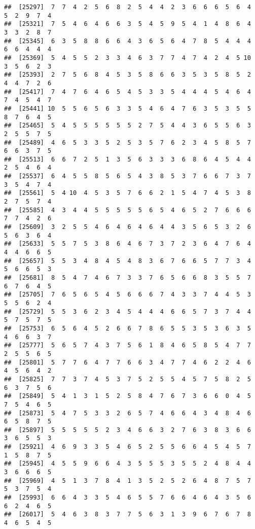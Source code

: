 \documentclass[
]{book}
\begin{document}
\begin{verbatim}
##  [25297]  7  7  4  2  5  6  8  2  5  4  4  2  3  6  6  6  5  6  4  5  2  9  7  4
##  [25321]  7  5  4  6  4  6  6  3  5  4  5  9  5  4  1  4  8  6  4  3  3  2  8  7
##  [25345]  6  3  5  8  8  6  6  4  3  6  5  6  4  7  8  5  4  4  4  6  6  4  4  4
##  [25369]  5  4  5  5  2  3  3  4  6  3  7  7  4  7  4  2  4  5 10  3  5  6  2  3
##  [25393]  2  7  5  6  8  4  5  3  5  8  6  6  3  5  3  5  8  5  2  4  4  7  2  6
##  [25417]  7  4  7  6  4  6  5  4  5  3  3  5  4  4  4  5  4  6  4  7  4  5  4  7
##  [25441] 10  5  5  6  5  6  3  3  5  4  6  4  7  6  3  5  3  5  5  8  7  6  4  5
##  [25465]  5  4  5  5  5  5  5  5  2  7  5  4  4  3  6  5  5  6  3  2  5  5  7  5
##  [25489]  4  6  5  3  3  5  2  5  3  5  7  6  2  3  4  5  8  5  7  6  6  3  7  5
##  [25513]  6  6  7  2  5  1  3  5  6  3  3  3  6  8  6  4  5  4  4  2  5  4  6  4
##  [25537]  6  4  5  5  8  5  6  5  4  3  8  5  3  7  6  6  7  3  7  3  5  4  7  4
##  [25561]  5  4 10  4  5  3  5  7  6  6  2  1  5  4  7  4  5  3  8  2  7  5  7  4
##  [25585]  4  3  4  4  5  5  5  5  5  6  5  4  6  5  2  7  6  6  6  7  7  4  2  6
##  [25609]  3  2  5  5  4  6  4  6  4  6  4  4  3  5  6  5  3  2  6  5  6  3  6  4
##  [25633]  5  5  7  5  3  8  6  4  6  7  3  7  2  3  6  4  7  6  4  4  4  6  6  5
##  [25657]  5  5  3  4  8  4  5  4  8  3  6  7  6  6  5  7  7  3  4  5  6  6  5  3
##  [25681]  8  5  4  7  4  6  7  3  3  7  6  5  6  6  8  3  5  5  7  6  7  6  4  5
##  [25705]  7  6  5  6  5  4  5  6  6  6  7  4  3  3  7  4  4  5  3  5  5  6  2  4
##  [25729]  5  5  3  6  2  3  4  5  4  4  4  6  6  5  7  3  7  4  4  5  7  5  7  5
##  [25753]  6  5  6  4  5  2  6  6  7  8  6  5  5  3  5  3  6  3  5  4  6  6  3  7
##  [25777]  5  6  5  7  4  3  7  5  6  1  8  4  6  5  8  5  4  7  7  2  5  5  6  5
##  [25801]  5  7  7  6  4  7  7  6  6  3  4  7  7  4  6  2  2  4  6  4  5  6  4  2
##  [25825]  7  7  3  7  4  5  3  7  5  2  5  5  4  5  7  5  8  2  5  6  3  7  5  6
##  [25849]  5  4  1  3  1  5  2  5  8  4  7  6  7  3  6  6  0  4  5  7  5  4  6  5
##  [25873]  5  4  7  5  3  3  2  6  5  7  4  6  6  4  3  4  8  4  6  6  5  8  7  5
##  [25897]  5  5  5  5  5  2  3  4  6  6  3  2  7  6  3  8  3  6  6  3  6  5  5  3
##  [25921]  4  6  9  3  3  5  4  6  5  2  5  5  6  6  4  5  4  5  7  1  5  8  7  5
##  [25945]  4  5  5  9  6  6  4  3  5  5  5  3  5  5  2  4  8  4  4  3  6  6  6  5
##  [25969]  4  5  1  3  7  8  4  1  3  5  2  5  2  6  4  8  7  5  7  5  3  7  5  4
##  [25993]  6  6  4  3  3  5  4  6  5  5  7  6  6  4  6  4  3  5  6  6  2  4  6  5
##  [26017]  5  4  6  3  8  3  7  7  5  6  3  1  3  9  6  7  6  7  8  4  6  5  4  5

\end{verbatim}
\end{document}
